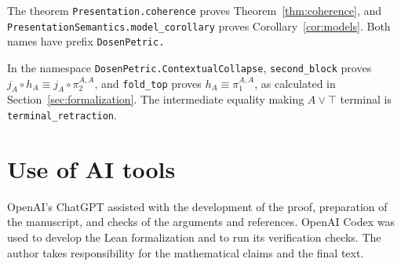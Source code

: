 \documentclass[11pt]{article}
\begin{document}
The theorem \texttt{Presentation.\allowbreak{}coherence} proves
Theorem~\ref{thm:coherence}, and
\texttt{PresentationSemantics.\allowbreak{}model\_corollary} proves
Corollary~\ref{cor:models}.
Both names have prefix \texttt{DosenPetric.}

In the namespace \texttt{DosenPetric.\allowbreak{}ContextualCollapse},
\texttt{second\_block} proves
$j_A\circ h_A\equiv j_A\circ\pi_2^{A,A}$, and
\texttt{fold\_top} proves
$h_A\equiv\pi_1^{A,A}$, as calculated in
Section~\ref{sec:formalization}.
The intermediate equality making $A\vee\top$ terminal is
\texttt{terminal\_retraction}.

\section*{Use of AI tools}
OpenAI's ChatGPT assisted with the development of the proof, preparation
of the manuscript, and checks of the arguments and references. OpenAI Codex
was used to develop the Lean formalization and to run its verification
checks. The author takes responsibility for the mathematical claims and
the final text.

\clearpage
\begingroup
\small
\setlength{\bibsep}{2pt}


\endgroup
\end{document}
